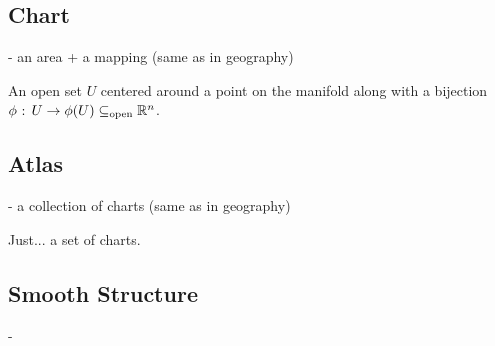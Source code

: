 \documentclass[11pt]{article}
\begin{document}
\subsection{Chart} - an area + a mapping (same as in geography)
\begin{redbox}
  An open set $U$ centered around a point on the manifold along with a bijection $\phi \text{ : } U \rightarrow \phi(U) \subseteq_{\text{open}} \mathbb{R}^n$.
\end{redbox}


\subsection{Atlas} - a collection of charts (same as in geography)
\begin{redbox}
  Just... a set of charts.
\end{redbox}



\subsection{Smooth Structure} - 
\begin{redbox}
  
\end{redbox}











  
\end{document}

